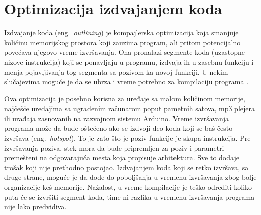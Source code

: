 \documentclass[12pt,oneside]{memoir}
\begin{document}
\chapter{Optimizacija izdvajanjem koda}
\label{sec:outlining}



Izdvajanje koda (eng.~{\em outlining}) je kompajlerska optimizacija koja smanjuje količinu memorijskog prostora koji zauzima program, ali pritom potencijalno povećava njegovo vreme izvršavanja.
Ona pronalazi segmente koda (uzastopne nizove instrukcija) koji se ponavljaju u programu, izdvaja ih u zasebnu funkciju i menja pojavljivanja tog segmenta sa pozivom ka novoj funkciji.
U nekim slučajevima moguće je da se ubrza i vreme potrebno za kompilaciju programa \cite{grune2012design}.

Ova optimizacija je posebno korisna za uređaje sa malom količinom memorije, najčešće uređajima sa ugrađenim računarom poput pametnih satova, mp3 plejera ili urađaja zasnovanih na razvojnom sistemu Arduino.
Vreme izvršavanja programa može da bude oštećeno ako se izdvoji deo koda koji se baš često izvršava (eng.~{\em hotspot}).
To je zato što je poziv funkcije je skupa instrukcija.
Pre izvršavanja poziva, stek mora da bude pripremljen za poziv i parametri premešteni na odgovarajuća mesta koja propisuje arhitektura.
Sve to dodaje trošak koji nije prethodno postojao.
Izdvajanjem koda koji se retko izvršava, sa druge strane, moguće je da dođe do poboljšanja u vremenu izvršavanja zbog bolje organizacije keš memorije.
Nažalost, u vreme kompilacije je teško odrediti koliko puta će se izvršiti segment koda, time ni razlika u vremenu izvršavanja programa nije lako predvidiva.
\end{document}
